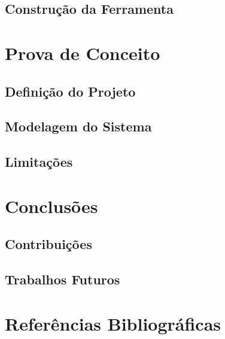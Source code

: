 \documentclass{beamer}
\begin{document}
\subsection[Construção da Ferramenta]{Construção da Ferramenta}

\section{Prova de Conceito}

\subsection[Definição do Projeto]{Definição do Projeto}

\subsection[Modelagem do Sistema]{Modelagem do Sistema}

\subsection[Limitações]{Limitações}

\section{Conclusões}

\subsection[Contribuições]{Contribuições}

\subsection[Trabalhos Futuros]{Trabalhos Futuros}

\section{Referências Bibliográficas}

\begin{frame}[allowframebreaks]





\end{frame}
\end{document}
